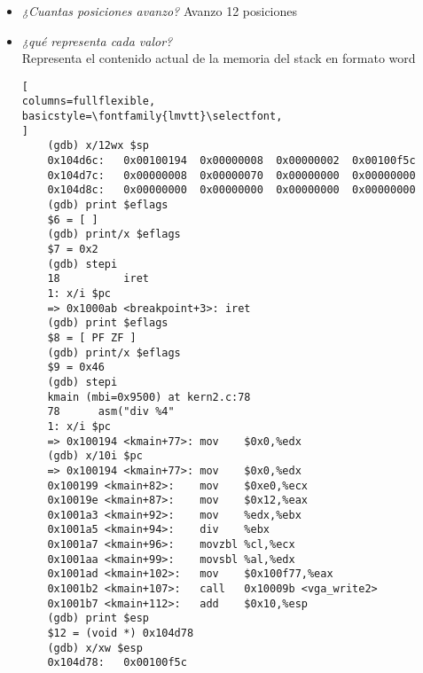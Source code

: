 \documentclass[a4paper, 12pt]{article}
\begin{document}
\begin{itemize}
\begin{lstlisting}[
columns=fullflexible,
basicstyle=\fontfamily{lmvtt}\selectfont,
]
	Breakpoint 1, idt_init () at interrupts.c:27
	27	    idt_install(T_BRKPT, breakpoint);
	1: x/i $pc
	=> 0x100586 <idt_init+3>:	push   $0x1000a8
	(gdb) finish
	Correr hasta la salida desde #0  idt_init () at interrupts.c:27
	kmain (mbi=0x9500) at kern2.c:73
	73	    asm("int3");  // (b)
	1: x/i $pc
	=> 0x100193 <kmain+76>:	int3
	(gdb) x/10i $pc
	=> 0x100193 <kmain+76>:	int3
	0x100194 <kmain+77>:	mov    $0x0,%edx
	0x100199 <kmain+82>:	mov    $0xe0,%ecx
	0x10019e <kmain+87>:	mov    $0x12,%eax
	0x1001a3 <kmain+92>:	mov    %edx,%ebx
	0x1001a5 <kmain+94>:	div    %ebx
	0x1001a7 <kmain+96>:	movzbl %cl,%ecx
	0x1001aa <kmain+99>:	movsbl %al,%edx
	0x1001ad <kmain+102>:	mov    $0x100f77,%eax
	0x1001b2 <kmain+107>:	call   0x10009b <vga_write2>
	(gdb) print $esp
	$1 = (void *) 0x104d78
	(gdb) x/xw $esp
	0x104d78:	0x00100f5c
	(gdb) print $cs
	$2 = 8
	(gdb) print $eflags
	$3 = [ ]
	(gdb) print/x $eflags
	$4 = 0x2
	(gdb) stepi
	breakpoint () at idt_entry.S:17
	17	        test %eax, %eax
	1: x/i $pc
	=> 0x1000a9 <breakpoint+1>:	test   %eax,%eax
	(gdb) print $esp
	$5 = (void *) 0x104d6c
\end{lstlisting}
				\item \textit{¿Cuantas posiciones avanzo?}
				Avanzo 12 posiciones
				\item \textit{¿qué representa cada valor?\\}
				Representa el contenido actual de la memoria del stack en
				formato word
\begin{lstlisting}[
columns=fullflexible,
basicstyle=\fontfamily{lmvtt}\selectfont,
]
	(gdb) x/12wx $sp
	0x104d6c:	0x00100194	0x00000008	0x00000002	0x00100f5c
	0x104d7c:	0x00000008	0x00000070	0x00000000	0x00000000
	0x104d8c:	0x00000000	0x00000000	0x00000000	0x00000000
	(gdb) print $eflags
	$6 = [ ]
	(gdb) print/x $eflags
	$7 = 0x2
	(gdb) stepi
	18	        iret
	1: x/i $pc
	=> 0x1000ab <breakpoint+3>:	iret
	(gdb) print $eflags
	$8 = [ PF ZF ]
	(gdb) print/x $eflags
	$9 = 0x46
	(gdb) stepi
	kmain (mbi=0x9500) at kern2.c:78
	78	    asm("div %4"
	1: x/i $pc
	=> 0x100194 <kmain+77>:	mov    $0x0,%edx
	(gdb) x/10i $pc
	=> 0x100194 <kmain+77>:	mov    $0x0,%edx
	0x100199 <kmain+82>:	mov    $0xe0,%ecx
	0x10019e <kmain+87>:	mov    $0x12,%eax
	0x1001a3 <kmain+92>:	mov    %edx,%ebx
	0x1001a5 <kmain+94>:	div    %ebx
	0x1001a7 <kmain+96>:	movzbl %cl,%ecx
	0x1001aa <kmain+99>:	movsbl %al,%edx
	0x1001ad <kmain+102>:	mov    $0x100f77,%eax
	0x1001b2 <kmain+107>:	call   0x10009b <vga_write2>
	0x1001b7 <kmain+112>:	add    $0x10,%esp
	(gdb) print $esp
	$12 = (void *) 0x104d78
	(gdb) x/xw $esp
	0x104d78:	0x00100f5c

\end{lstlisting}
\end{itemize}
\end{document}
